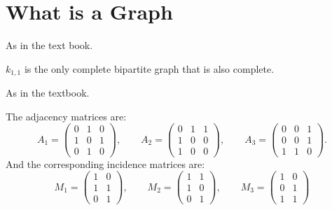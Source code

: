 \section{What is a Graph}

\begin{problem}
	As in the text book.
\end{problem}
\begin{solution}
	$ k_{1,1} $ is the only complete bipartite graph that is also complete.
\end{solution}

\begin{problem}
	As in the textbook.
\end{problem}
\begin{solution}
	The adjacency matrices are:
	\[ A_1 = \begin{pmatrix}
		0 & 1 & 0 \\
		1 & 0 & 1 \\
		0 & 1 & 0
	\end{pmatrix},\qquad
	A_2 = \begin{pmatrix}
		0 & 1 & 1 \\
		1 & 0 & 0 \\
		1 & 0 & 0
	\end{pmatrix}, \qquad 
	A_3 = \begin{pmatrix}
		0 & 0 & 1 \\
		0 & 0 & 1 \\
		1 & 1 & 0
	\end{pmatrix}.
	 \]
	And the corresponding incidence matrices are:
	\[ 
	M_1 = \begin{pmatrix}
		1 & 0 \\
		1 & 1 \\
		0 & 1
	\end{pmatrix}, \qquad
	M_2 = \begin{pmatrix}
		1 & 1 \\
		1 & 0 \\
		0 & 1 
	\end{pmatrix}, \qquad 
	M_3 = \begin{pmatrix}
		1 & 0 \\
		0 & 1 \\
		1 & 1
	\end{pmatrix}
	 \]
	 

\end{solution}

